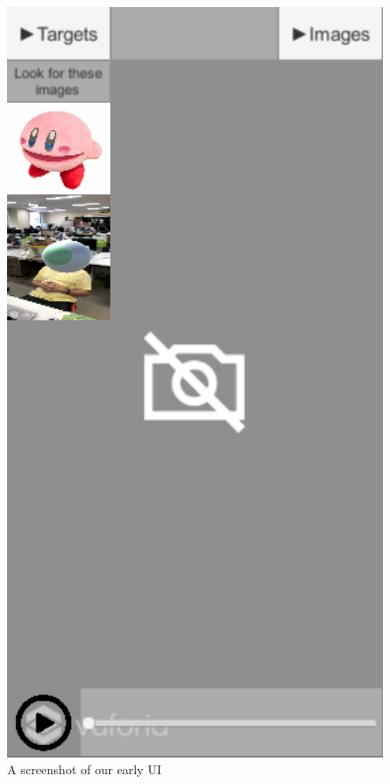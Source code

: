 \documentclass[a4paper, 10pt, american, titlepage]{article}
\begin{document}
\begin{figure}[h]
	\centering
	\includegraphics[width=1\textwidth]{old-ui.png}
	\caption[A screenshot of our early UI]
	{A screenshot of our early UI}
	\label{fig:oldUI}
\end{figure}
\end{document}
